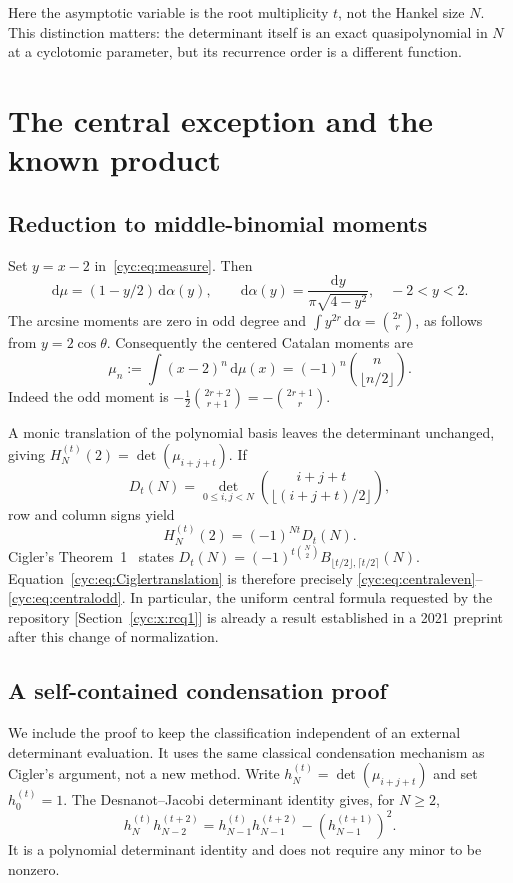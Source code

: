 \documentclass[11pt,a4paper]{article}
\numberwithin{equation}{section}
\theoremstyle{definition}
\theoremstyle{remark}
\newcommand{\dd}{\mathrm d}
\newcommand{\cH}[2]{H_{#1}^{(#2)}}
\begin{document}
Here the asymptotic variable is the root multiplicity $t$, not the
Hankel size $N$.  This distinction matters: the determinant itself is
an exact quasipolynomial in $N$ at a cyclotomic parameter, but its
recurrence order is a different function.

\section{The central exception and the known product}\label{cyc:sec:central}

\subsection{Reduction to middle-binomial moments}
Set $y=x-2$ in~\eqref{cyc:eq:measure}.  Then
\begin{equation}\label{cyc:eq:arcsine}
 \dd\mu=(1-y/2)\,\dd\alpha(y),\qquad
 \dd\alpha(y)=\frac{\dd y}{\pi\sqrt{4-y^2}},\quad -2<y<2.
\end{equation}
The arcsine moments are zero in odd degree and
$\int y^{2r}\,\dd\alpha=\binom{2r}{r}$, as follows from
$y=2\cos\theta$.  Consequently the centered Catalan moments are
\begin{equation}\label{cyc:eq:centeredmoments}
 \mu_n:=\int(x-2)^n\,\dd\mu(x)
 =(-1)^n\binom n{\lfloor n/2\rfloor}.
\end{equation}
Indeed the odd moment is
$-\frac12\binom{2r+2}{r+1}=-\binom{2r+1}{r}$.

A monic translation of the polynomial basis leaves the determinant
unchanged, giving $\cH Nt(2)=\det(\mu_{i+j+t})$.  If
\[
 D_t(N)=\det_{0\le i,j<N}\binom{i+j+t}{\lfloor(i+j+t)/2\rfloor},
\]
row and column signs yield
\begin{equation}\label{cyc:eq:Ciglertranslation}
 \cH Nt(2)=(-1)^{Nt}D_t(N).
\end{equation}
Cigler's Theorem~1~\cite{Cigler2021} states
$D_t(N)=(-1)^{t\binom N2}B_{\lfloor t/2\rfloor,\lceil t/2\rceil}(N)$.
Equation~\eqref{cyc:eq:Ciglertranslation} is therefore precisely
\eqref{cyc:eq:centraleven}--\eqref{cyc:eq:centralodd}.  In particular, the
uniform central formula requested by the repository
[Section~\ref{cyc:x:rcq1}] is already a
result established in a 2021 preprint after this change of normalization.

\subsection{A self-contained condensation proof}
We include the proof to keep the classification independent of an
external determinant evaluation.  It uses the same classical
condensation mechanism as Cigler's argument, not a new method.
Write $h_N^{(t)}=\det(\mu_{i+j+t})$ and set $h_0^{(t)}=1$.
The Desnanot--Jacobi determinant identity gives, for $N\ge2$,
\begin{equation}\label{cyc:eq:condensation}
 h_N^{(t)}h_{N-2}^{(t+2)}
 =h_{N-1}^{(t)}h_{N-1}^{(t+2)}-(h_{N-1}^{(t+1)})^2.
\end{equation}
It is a polynomial determinant identity and does not require any
minor to be nonzero.
\end{document}
